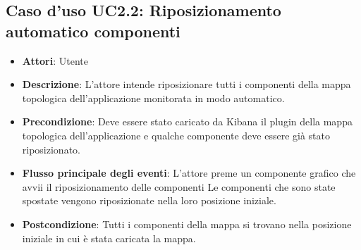 \subsection{Caso d'uso UC2.2: Riposizionamento automatico componenti}
\begin{itemize}
	\item \textbf{Attori}: Utente
	\item \textbf{Descrizione}: L'attore intende riposizionare tutti i componenti della mappa topologica dell'applicazione monitorata in modo automatico.
	\item \textbf{Precondizione}: Deve essere stato caricato da Kibana il plugin della mappa topologica dell'applicazione e qualche componente deve essere già stato riposizionato.
	\item \textbf{Flusso principale degli eventi}: L'attore preme un componente grafico che avvii il riposizionamento delle componenti Le componenti che sono state spostate vengono riposizionate nella loro posizione iniziale.
	\item \textbf{Postcondizione}: Tutti i componenti della mappa si trovano nella posizione iniziale in cui è stata caricata la mappa.
\end{itemize}
